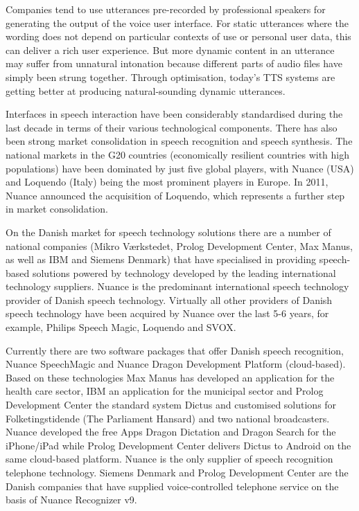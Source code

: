 \begin{multicols}{2}

Companies tend to use utterances pre-recorded by professional speakers for generating the output of the voice user interface. For static utterances where the wording does not depend on particular contexts of use or personal user data, this can deliver a rich user experience. But more dynamic content in an utterance may suffer from unnatural intonation because different parts of audio files have simply been strung together. Through optimisation, today’s TTS systems are getting better at producing natural-sounding dynamic utterances.

Interfaces in speech interaction have been considerably standardised during the last decade in terms of their various technological components. There has also been strong market consolidation in speech recognition and speech synthesis. The national markets in the G20 countries (economically resilient countries with high populations) have been dominated by just five global players, with Nuance (USA) and Loquendo (Italy) being the most prominent players in Europe. In 2011, Nuance announced the acquisition of Loquendo, which represents a further step in market consolidation.

On the Danish market for speech technology solutions there are a
number of national companies (Mikro V\ae rkstedet, Prolog Development
Center, Max Manus, as well as IBM and Siemens Denmark) that have
specialised in providing speech-based solutions powered by technology
developed by the leading international technology suppliers. Nuance is
the predominant international speech technology provider of Danish
speech technology. Virtually all other providers of Danish speech
technology have been acquired by Nuance over the last 5-6 years, for
example, Philips Speech Magic, Loquendo and SVOX.

Currently there are two software packages that offer Danish speech
recognition, Nuance SpeechMagic and Nuance Dragon Development Platform
(cloud-based). Based on these technologies Max Manus has developed an
application for the health care sector, IBM an application for the
municipal sector and Prolog Development Center the standard system
Dictus and customised solutions for Folketingstidende (The Parliament
Hansard) and two national broadcasters. Nuance developed the free Apps
Dragon Dictation and Dragon Search for the iPhone/iPad while Prolog
Development Center delivers Dictus to Android on the same cloud-based
platform. Nuance is the only supplier of speech recognition telephone
technology. Siemens Denmark and Prolog Development Center are the
Danish companies that have supplied voice-controlled telephone service
on the basis of Nuance Recognizer v9.


\end{multicols}
